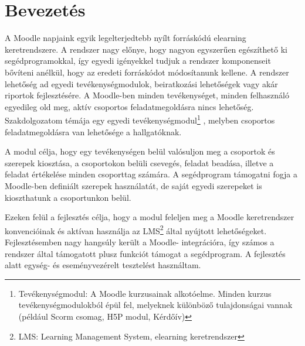 \chapter{Bevezetés}
\label{ch:intro}

A Moodle napjaink egyik legelterjedtebb nyílt forráskódú elearning keretrendszere. A rendszer nagy előnye, hogy nagyon egyszerűen egészíthető ki segédprogramokkal, így egyedi igényekkel tudjuk a rendszer komponenseit bővíteni anélkül, hogy az eredeti forráskódot módosítanunk kellene. A rendszer lehetőség ad egyedi tevékenységmodulok, beiratkozási lehetőségek vagy akár riportok fejlesztésére. A Moodle-ben minden tevékenységet, minden felhasználó egyedileg old meg, aktív csoportos feladatmegoldásra nincs lehetőség. Szakdolgozatom témája egy egyedi tevékenységmodul\footnote{Tevékenységmodul: A Moodle kurzusainak alkotóelme. Minden kurzus tevékenységmodulokból épül fel, melyeknek különböző tulajdonságai vannak (például Scorm csomag, H5P modul, Kérdőív) } , melyben csoportos feladatmegoldásra van lehetősége a hallgatóknak. 

A modul célja, hogy egy tevékenységen belül valósuljon meg a csoportok és szerepek kiosztása, a csoportokon belüli csevegés, feladat beadása, illetve a feladat értékelése minden csoporttag számára. A segédprogram támogatni fogja a Moodle-ben definiált szerepek használatát, de saját egyedi szerepeket is kioszthatunk a csoportunkon belül.

Ezeken felül a fejlesztés célja, hogy a modul feleljen meg a Moodle keretrendszer konvencióinak és aktívan használja az LMS\footnote{LMS: Learning Management System, elearning keretrendszer} által nyújtott lehetőségeket. Fejlesztésemben nagy hangsúly került a Moodle- integrációra, így számos a rendszer által támogatott plusz funkciót támogat a segédprogram. A fejlesztés alatt egység- és eseményvezérelt tesztelést használtam.
